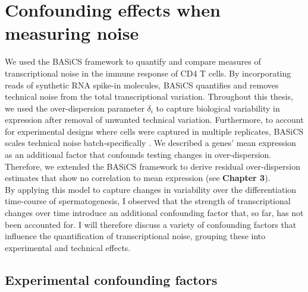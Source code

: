 \newpage

\section{Confounding effects when measuring noise}

We used the BASiCS framework to quantify and compare measures of transcriptional noise in the immune response of CD4\plus{} T cells. By incorporating reads of synthetic RNA spike-in molecules, BASiCS quantifies and removes technical noise from the total transcriptional variation. Throughout this thesis, we used the over-dispersion parameter $\delta_i$ to capture biological variability in expression after removal of unwanted technical variation. Furthermore, to account for experimental designs where cells were captured in multiple replicates, BASiCS scales technical noise batch-specifically  \citep{Vallejos2015BASiCS}. We described a genes' mean expression as an additional factor that confounds testing changes in over-dispersion. Therefore, we extended the BASiCS framework to derive residual over-dispersion estimates that show no correlation to mean expression (see \textbf{Chapter 3}). \\

By applying this model to capture changes in variability over the differentiation time-course of spermatogenesis, I observed that the strength of transcriptional changes over time introduce an additional confounding factor that, so far, has not been accounted for. I will therefore discuss a variety of confounding factors that influence the quantification of transcriptional noise, grouping these into experimental and technical effects.

\subsection{Experimental confounding factors}

